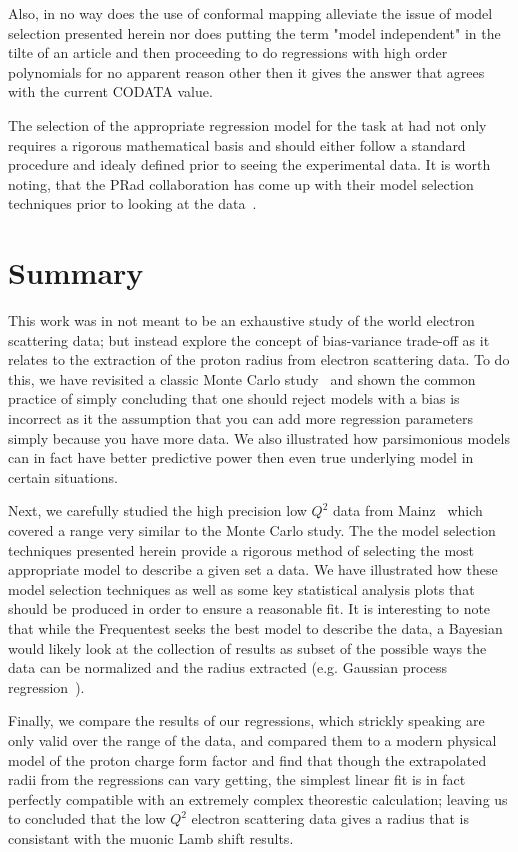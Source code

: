 \documentclass[10pt,aps,prc,twocolumn]{revtex4-1}
\begin{document}
Also, in no way does the use of conformal mapping alleviate the issue of model selection presented herein nor does
putting the term "model independent" in the tilte of an article and then proceeding to do regressions with high 
order polynomials for no apparent reason other then it gives the answer that agrees with the current CODATA value.

The selection of the appropriate regression model for the task at had not only requires a rigorous mathematical basis
and should either follow a standard procedure and idealy defined prior to seeing the experimental data.
It is worth noting, that the PRad collaboration has come up with their model selection techniques
prior to looking at the data~\cite{Yan:2018bez}.


\section{Summary}

This work was in not meant to be an exhaustive study of the world electron scattering data; but 
instead explore the concept of bias-variance trade-off as it relates to the extraction of the proton 
radius from electron scattering data.
To do this, we have revisited a classic Monte Carlo study~\cite{Borkowski:1975ume} and shown
the common practice of simply concluding that one should reject models with a bias is incorrect
as it the assumption that you can add more regression parameters simply because you have more data.  
We also illustrated how parsimonious models can in fact have better 
predictive power then even true underlying model in certain situations. 

Next, we carefully studied the high precision low $Q^2$ data from Mainz~\cite{Bernauer:2010wm} which covered a range
very similar to the Monte Carlo study.  The the model selection techniques
presented herein provide a rigorous method of selecting the most appropriate model to describe a given
set a data.  We have illustrated how these model selection techniques as well as some key statistical 
analysis plots that should be produced in order to ensure a reasonable fit.   
It is interesting to note that while the Frequentest
seeks the best model to describe the data, a Bayesian would likely look at the collection of results as  
subset of the possible ways the data can be normalized and the radius extracted (e.g. Gaussian process 
regression~\cite{Rasmussen:2005}).    

Finally, we compare the results of our regressions, which strickly speaking are only valid over the
range of the data, and compared them to a modern physical model of the proton charge form factor
and find that though the extrapolated radii from the regressions can vary getting, the simplest
linear fit is in fact perfectly compatible with an extremely complex theorestic calculation; leaving
us to concluded that the low $Q^2$ electron scattering data gives a radius that is
consistant with the muonic Lamb shift results.
\end{document}

